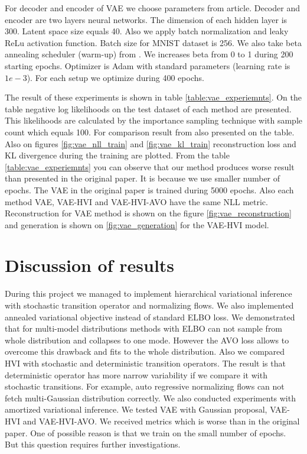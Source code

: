 \documentclass{article}
\begin{document}
For decoder and encoder of VAE we choose parameters from \cite{TW:2016} article. Decoder and encoder are two layers neural networks. The dimension of each hidden layer is 300. Latent space size equals 40. Also we apply batch normalization and leaky ReLu activation function. Batch size for MNIST dataset is 256. We also take beta annealing scheduler (warm-up) from \cite{snderby2016ladder}. We increases beta from 0 to 1 during 200 starting epochs. Optimizer is Adam with standard parameters (learning rate is $1e-3$). For each setup we optimize during 400 epochs.

The result of these experiments is shown in table \ref{table:vae_experiemnts}. On the table negative log likelihoods on the test dataset of each method are presented. This likelihoods are calculated by the importance sampling technique \cite{burda2015importance} with sample count which equals 100. For comparison result from \cite{main_Huang2018ImprovingEI} also presented on the table. Also on figures \ref{fig:vae_nll_train} and \ref{fig:vae_kl_train} reconstruction loss and KL divergence during the training are plotted. From the table \ref{table:vae_experiemnts} you can observe that our method produces worse result than presented in the original paper. It is because we use smaller number of epochs. The VAE in the original paper is trained during 5000 epochs. Also each method VAE, VAE-HVI and VAE-HVI-AVO have the same NLL metric. Reconstruction for VAE method is shown on the figure \ref{fig:vae_reconstruction} and generation is shown on \ref{fig:vae_generation} for the VAE-HVI model.



\section{Discussion of results}
During this project we managed to implement hierarchical variational inference with stochastic transition operator and normalizing flows. We also implemented annealed variational objective instead of standard ELBO loss. We demonstrated that for multi-model distributions methods with ELBO can not sample from whole distribution and collapses to one mode. However the AVO loss allows to overcome this drawback and fits to the whole distribution. Also we compared HVI with stochastic and deterministic transition operators. The result is that deterministic operator has more narrow variability if we compare it with stochastic transitions. For example, auto regressive normalizing flows can not fetch multi-Gaussian distribution correctly. We also conducted experiments with amortized variational inference. We tested VAE with Gaussian proposal, VAE-HVI and VAE-HVI-AVO. We received metrics which is worse than in the original paper. One of possible reason is that we train on the small number of epochs. But this question requires further investigations.
\end{document}
